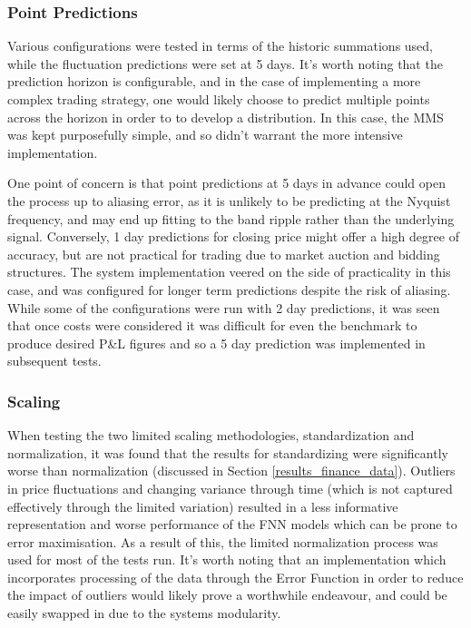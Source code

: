 \documentclass[a4paper,11pt,oneside]{article}
\theoremstyle{plain}
\theoremstyle{definition}
\begin{document}
	\subsubsection {Point Predictions} Various configurations were tested in terms of the historic summations used, while the fluctuation predictions were set at 5 days. It's worth noting that the prediction horizon is configurable, and in the case of implementing a more complex trading strategy, one would likely choose to predict multiple points across the horizon in order to to develop a distribution. In this case, the MMS was kept purposefully simple, and so didn't warrant the more intensive implementation. \newline
	
	One point of concern is that point predictions at 5 days in advance could open the process up to aliasing error, as it is unlikely to be predicting at the Nyquist frequency, and may end up fitting to the band ripple rather than the underlying signal. Conversely, 1 day predictions for closing price might offer a high degree of accuracy, but are not practical for trading due to market auction and bidding structures. The system implementation veered on the side of practicality in this case, and was configured for longer term predictions despite the risk of aliasing. While some of the configurations were run with 2 day predictions, it was seen that once costs were considered it was difficult for even the benchmark to produce desired P\&L figures and so a 5 day prediction was implemented in subsequent tests.
	
	
	
	\subsubsection {Scaling} When testing the two limited scaling methodologies, standardization and normalization, it was found that the results for standardizing were significantly worse than normalization (discussed in Section \ref{results_finance_data}). Outliers in price fluctuations and changing variance through time (which is not captured effectively through the limited variation) resulted in a less informative representation and worse performance of the FNN models which can be prone to error maximisation. As a result of this, the limited normalization process was used for most of the tests run. It's worth noting that an implementation which incorporates processing of the data through the Error Function in order to reduce the impact of outliers would likely prove a worthwhile endeavour, and could be easily swapped in due to the systems modularity.\newline
	
\end{document}
